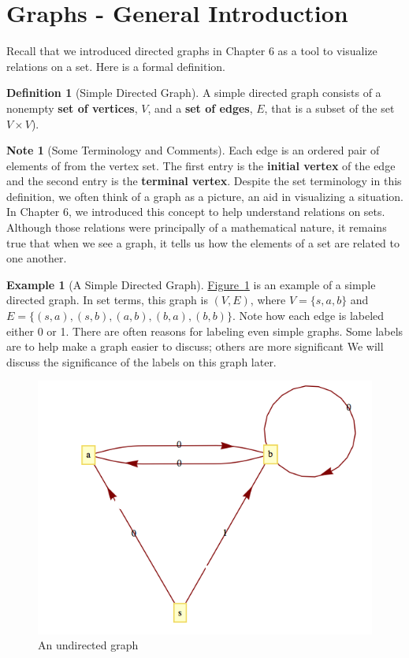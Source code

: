 \documentclass[10pt,]{book}
\newcommand{\terminology}[1]{\textbf{#1}}
\theoremstyle{plain}
\theoremstyle{definition}
\newtheorem{definition}[theorem]{Definition}
\theoremstyle{definition}
\newtheorem{note}[theorem]{Note}
\theoremstyle{definition}
\newtheorem{example}[theorem]{Example}
\theoremstyle{definition}
\theoremstyle{definition}
\numberwithin{equation}{section}
\begin{document}
\section[Graphs - General Introduction]{Graphs - General Introduction}\label{s-graphs-introduction}
Recall that we introduced directed graphs in Chapter 6 as a tool to visualize relations on a set.  Here is a formal definition.%
\begin{definition}[Simple Directed Graph]\label{def-simple-directed-graph}
 A simple directed graph consists of a nonempty \terminology{set of vertices}, \(V\), and a \terminology{set of edges}, \(E\), that is a subset of the set \(V \times V\)).  %
\end{definition}
\begin{note}[Some Terminology and Comments]\label{note-1}
Each edge is an ordered pair of elements of from the vertex set.  
The first entry is the \terminology{initial vertex} of the edge and the second entry is the \terminology{terminal vertex}. Despite the set terminology in this definition, we often think of a graph as a picture, an aid in visualizing a situation. In Chapter 6, we introduced
this concept to help understand relations on sets. Although those relations were principally of a mathematical nature, it remains true that when
we see a graph, it tells us how the elements of a set are related to one another.%
\end{note}
\begin{example}[A Simple Directed Graph]\label{ex-9-1}
\hyperref[fig-directed-graph-ex1]{Figure~\ref{fig-directed-graph-ex1}} is an example of a simple directed graph. In set terms, this graph is \((V, E)\), where \(V = \{s, a, b\}\) and \(E = \{(s, a), (s, b), (a, b), (b, a), (b,b)\}\). Note how each edge is labeled either 0 or 1. There are often reasons for labeling even simple graphs. Some labels are to help make a graph easier to discuss; others are more significant We will discuss the significance of the
labels on this graph later.%
\leavevmode%
\begin{figure}
\centering
\includegraphics[width=1\linewidth]{images/fig-directed-graph-ex1.png}
\caption{An undirected graph\label{fig-directed-graph-ex1}}
\end{figure}
\end{example}
\end{document}
